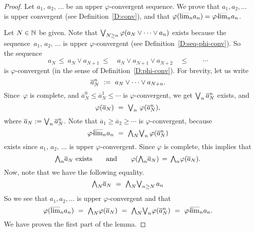 \documentclass[main.tex]{subfiles}
\begin{document}
\begin{proof}
Let $a_1,\,a_2,\,\dotsc$ be an upper $\varphi$-convergent sequence.
We prove that $a_1,a_2,\dotsc$ is upper convergent
(see Definition~\ref{D:conv}),
and that $\varphi(\smash{\overline{\lim}_{n}}a_n) = {\varphi}\text{-}\!\smash{\overline{\lim}_{n}}a_n$.

Let $N\in\mathbb{N}$ be given.
Note that $\textstyle{\bigvee}_{N\geq n} \,\varphi(a_N\vee\dotsb\vee a_n)$
exists because the sequence~$a_1,\,a_2,\,\dotsc$ is upper $\varphi$-convergent
(see Definition~\ref{D:seq-phi-conv}).
So the sequence
\begin{equation*}
a_N \,\leq\ a_N \vee a_{N+1} 
    \ \leq\quad a_N\vee a_{N+1} \vee a_{N+2} 
    \quad \leq\qquad \dotsb
\end{equation*}
is $\varphi$-convergent (in the sense of
Definition~\ref{D:phi-conv}).
For brevity,
let us write
\begin{equation*}
\overline{a}_{N}^n \ := \ a_N\vee\dotsb\vee a_{N+n}.
\end{equation*}
Since~$\varphi$ is complete,
and $\overline{a}_N^0 \leq \overline{a}_N^1 \leq\dotsb$
is $\varphi$-convergent,
we get $\textstyle{\bigvee}_n\,\overline{a}_N^n$ exists,
and 
\begin{equation*}
\varphi(\overline{a}_N) 
\ =\ 
 \bv_{n}\ \varphi( \overline{a}_N^n),
\end{equation*}
where 
$\overline{a}_N := \textstyle{\bigvee}_n \,\overline{a}_N^n$.
Note that $\overline{a}_1 \geq \overline{a}_2 \geq\dotsb$
is $\varphi$-convergent,
because
\begin{equation*}
\pulim\varphi{n} a_n
\ =\ 
\bw_N\bv_n\, \varphi(\overline{a}^n_N)
\end{equation*}
exists since $a_1,\,a_2,\,\dotsc$ is upper $\varphi$-convergent.
Since $\varphi$ is complete,
this implies that
\begin{equation*}
\textstyle{\bigwedge}_n \overline{a}_N\text{ exists}
\qquad\text{and}\qquad \varphi(\textstyle{\bigwedge}_n \overline{a}_N)
\,=\,
\textstyle{\bigwedge}_n\varphi(\overline{a}_N).
\end{equation*}
Now,
note that  we have the following equality.
\begin{equation*}
\bw_N \overline{a}_N \ =\ 
\bw_N \bv_{n\geq N} \, a_n
\end{equation*}
So we see that $a_1,a_2,\dotsc$
is upper $\varphi$-convergent and that
\begin{equation*}
\varphi(\ulim{n}a_n)
\ =\ 
\bw_N\varphi(\overline{a}_N)
\ =\ 
\bw_N \bv_n \varphi(\overline{a}^n_N)
\ =\ 
\pulim\varphi{n} a_n.
\end{equation*}
We have proven the first part of the lemma.


\end{proof}
\end{document}
